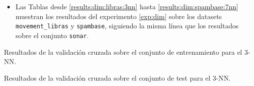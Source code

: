 \begin{itemize}
    \item Las Tablas desde \ref{results:dim:libras:3nn} hasta \ref{results:dim:spambase:7nn} muestran los resultados del experimento \ref{exp:dim} sobre los datasets \texttt{movement\_libras} y \texttt{spambase}, siguiendo la misma línea que los resultados sobre el conjunto \texttt{sonar}.

\end{itemize}

\begin{comment}
Las Figuras \ref{results:normal:3nn:train} y \ref{results:normal:3nn:test} muestran los resultados obtenidos para el primer experimento con el 3-NN sobre los conjuntos de entrenamiento y test, respectivamente. Las Figuras \ref{results:normal:5nn:train}, \ref{results:normal:5nn:test}, \ref{results:normal:7nn:train} y \ref{results:normal:7nn:test} muestran resultados análogos para los clasificadores 5-NN y 7-NN. A estos resultados se les ha añadido, como medidas de valoración, la puntuación promedia obtenida, y el ranking promedio. Este ranking se ha obtenido asignando valores enteros entre 1 y 10 (añadiendo medias fracciones en caso de empate) según la posición de los algoritmos en cada dataset, obteniendo un 1 el algoritmo que ha quedado en mejor posición, y un 10 el aquel que quede en la última. Las celdas que no muestran resultados se deben a que el algoritmo no ha convergido.

En las Figuras \ref{results:ncm:train} y \ref{results:ncm:test} se muestran los resultados para los clasificadores basados en centroides cercanos, y las Figuras \ref{results:ker:3nn:train:1}, \ref{results:ker:3nn:train:2}, \ref{results:ker:3nn:test:1} y \ref{results:ker:3nn:test:2} muestran los resultados de los experimentos con kernels. Por último, entre las Figuras \ref{results:dim:sonar:3nn} y \ref{results:dim:spambase:7nn} se muestran los resultados de los experimentos de dimensionalidad.
\end{comment}

\begin{table}[!htbp]
\resizebox{\textwidth}{!}{%
    
}
\caption{Resultados de la validación cruzada sobre el conjunto de entrenamiento para el 3-NN.} \label{results:normal:3nn:train}
\end{table}

\begin{table}[!htbp]
\resizebox{\textwidth}{!}{%
    
}
\caption{Resultados de la validación cruzada sobre el conjunto de test para el 3-NN.} \label{results:normal:3nn:test}
\end{table}

